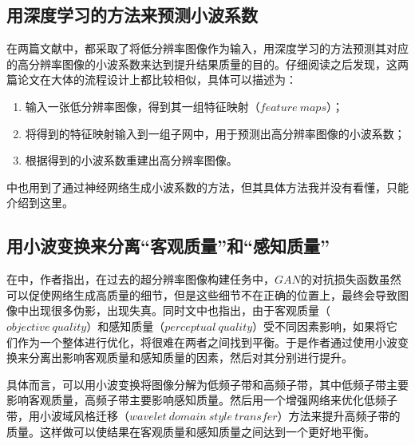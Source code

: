 \documentclass[UTF8]{ctexart}
\begin{document}
        \subsection{用深度学习的方法来预测小波系数}
        
            \indent 在\cite{zhong2018joint, huang2017wavelet}两篇文献中，都采取了将低分辨率图像作为输入，用深度学习的方法预测其对应的高分辨率图像的小波系数来达到提升结果质量的目的。仔细阅读之后发现，这两篇论文在大体的流程设计上都比较相似，具体可以描述为：
    			
                \begin{enumerate}[leftmargin=50pt]
    				\item 输入一张低分辨率图像，得到其一组特征映射（$feature\ maps$）；
    				\item 将得到的特征映射输入到一组子网中，用于预测出高分辨率图像的小波系数；
    				\item 根据得到的小波系数重建出高分辨率图像。
    			\end{enumerate}
                
            \indent \cite{gao2016hybrid}中也用到了通过神经网络生成小波系数的方法，但其具体方法我并没有看懂，只能介绍到这里。
                        
        \subsection{用小波变换来分离“客观质量”和“感知质量”}
            
            \indent 在\cite{deng2019wavelet}中，作者指出，在过去的超分辨率图像构建任务中，$GAN$的对抗损失函数虽然可以促使网络生成高质量的细节，但是这些细节不在正确的位置上，最终会导致图像中出现很多伪影，出现失真。同时文中也指出，由于客观质量（$objective\ quality$）和感知质量（$perceptual\ quality$）受不同因素影响，如果将它们作为一个整体进行优化，将很难在两者之间找到平衡。于是作者通过使用小波变换来分离出影响客观质量和感知质量的因素，然后对其分别进行提升。
            
            \indent 具体而言，可以用小波变换将图像分解为低频子带和高频子带，其中低频子带主要影响客观质量，高频子带主要影响感知质量。然后用一个增强网络来优化低频子带，用小波域风格迁移（$wavelet\ domain\ style\ transfer$）方法来提升高频子带的质量。这样做可以使结果在客观质量和感知质量之间达到一个更好地平衡。
            
  
\end{document}
